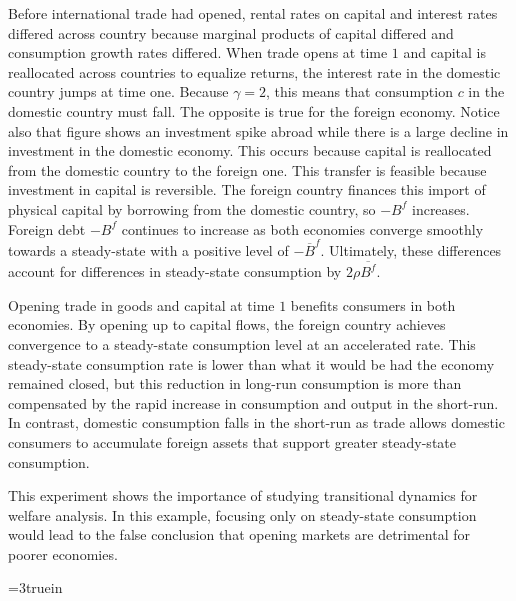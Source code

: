 Before international  trade had opened, rental rates on capital and interest rates differed across country because
marginal products of capital differed and consumption growth rates differed.  When trade opens at
time $1$ and  capital is reallocated across countries to equalize returns,  the interest rate in the domestic country
jumps  at time one. Because $\gamma =2$, this means that consumption $c$ in the domestic country  must fall. The opposite is
true for the foreign economy.
\newpage
\noindent Notice also that figure  shows an
investment spike abroad while  there is a large decline in investment in
the domestic economy. This occurs because capital is reallocated from the domestic country to the foreign one.
This transfer is feasible because investment in capital is
reversible. The foreign country finances this import of physical capital by borrowing from the domestic
country, so $- B^f$ increases. %
 Foreign debt $- B^f$  continues to increase as both economies converge smoothly towards a
steady-state with a positive level of $- \overline{B}^f$. Ultimately, these
differences account for differences in steady-state consumption by $2 \rho
\overline{B^f}$.

Opening trade in goods and capital at time $1$ benefits consumers in both economies.
 By
 opening up  to capital flows, the foreign country achieves convergence to
a steady-state consumption level at an accelerated rate. This steady-state
consumption rate is lower than what it would be had the economy remained
closed, but this reduction in long-run consumption is more than compensated
by the rapid increase in consumption and output in  the short-run. In contrast, domestic consumption
falls in the short-run as trade allows domestic consumers to accumulate
foreign assets that  support  greater steady-state consumption.

This experiment shows the importance of studying transitional dynamics for
welfare analysis. In this example, focusing only on steady-state consumption
would lead to the false conclusion that opening markets are detrimental for
poorer economies.


\centerline{\epsfxsize=3truein}
\caption{Response to  increase in $g$ at time $10$ foreseen at time $1$.
From left to right, top to bottom: $k, c, \bar R, x, g, B^f$. The dashed-dotted  line is the original
steady state in the domestic country.  The dashed line denotes the foreign country.}
\endfigure





